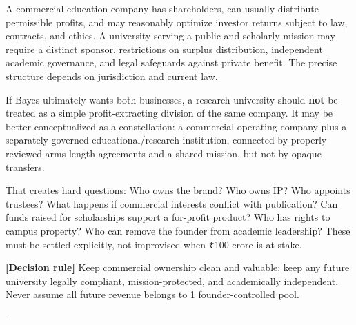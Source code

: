 A commercial education company has shareholders, can usually distribute permissible profits, and may reasonably optimize investor returns subject to law, contracts, and ethics. A university serving a public and scholarly mission may require a distinct sponsor, restrictions on surplus distribution, independent academic governance, and legal safeguards against private benefit. The precise structure depends on jurisdiction and current law.

If Bayes ultimately wants both businesses, a research university should \textbf{not} be treated as a simple profit-extracting division of the same company. It may be better conceptualized as a constellation: a commercial operating company plus a separately governed educational/\allowbreak research institution, connected by properly reviewed arms-length agreements and a shared mission, but not by opaque transfers.

That creates hard questions: Who owns the brand? Who owns IP? Who appoints trustees? What happens if commercial interests conflict with publication? Can funds raised for scholarships support a for-profit product? Who has rights to campus property? Who can remove the founder from academic leadership? These must be settled explicitly, not improvised when \textnormal{₹}100 crore is at stake.

\textbf{\textbf{[Decision rule]}} Keep commercial ownership clean and valuable; keep any future university legally compliant, mission-protected, and academically independent. Never assume all future revenue belongs to 1 founder-controlled pool.

-


